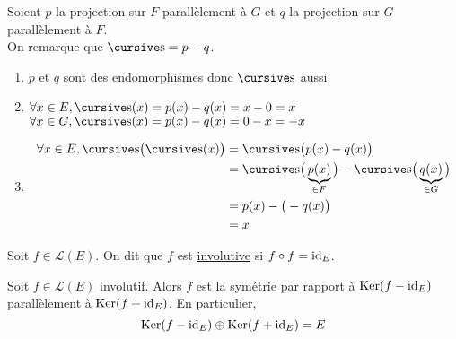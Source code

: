 \begin{prv}
	Soient $p$ la projection sur $F$ parallèlement à $G$ et $q$ la projection sur $G$ parallèlement à $F$.\\
	On remarque que $\s = p - q$.
	\begin{enumerate}
		\item $p$ et $q$ sont des endomorphismes donc $\s$ aussi
		\item $\forall x \in E, \s(x) = p(x) - q(x) = x - 0 = x$ \\
			$\forall x \in G, \s(x) = p(x) - q(x) = 0 - x = -x$ 
		\item
			\begin{align*}
				\forall x \in E, \s\big(\s(x)\big) &= \s\big(p(x) - q(x)\big) \\
				&= \s\big(\underbrace{p(x)}_{\in F}\big) - \s\big(\underbrace{q(x)}_{\in G}\big) \\
				&= p(x) - \big(-q(x)\big) \\
				&= x \\
			\end{align*}
	\end{enumerate}
\end{prv}

\begin{defn}
	Soit $f \in \mathcal{L}(E)$. On dit que $f$ est \underline{involutive} si $f \circ f = \operatorname{id}_{E}$.
\end{defn}

\begin{prop}
	Soit $f \in \mathcal{L}(E)$ involutif. Alors $f$ est la symétrie par rapport à $\operatorname{Ker}(f - \operatorname{id}_E)$ parallèlement à $\operatorname{Ker}(f + \operatorname{id}_E)$. En particulier, \[
		\operatorname{Ker}(f - \operatorname{id}_E) \oplus \operatorname{Ker}(f + \operatorname{id}_E) = E
	\]
\end{prop}

